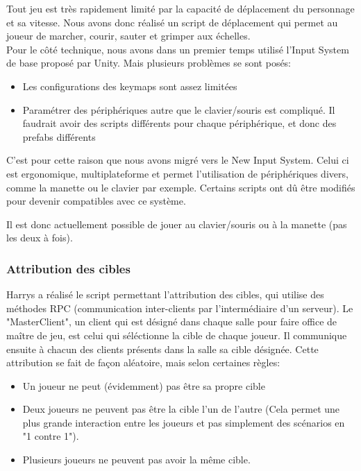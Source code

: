             Tout jeu est très rapidement limité par la capacité de déplacement du personnage et sa vitesse.
            Nous avons donc réalisé un script de déplacement qui permet au joueur de marcher, courir, sauter et grimper aux échelles.\\

            Pour le côté technique, nous avons dans un premier temps utilisé l'Input System de base proposé par Unity. Mais plusieurs problèmes se sont posés:
            \begin{itemize}
                \item Les configurations des keymaps sont assez limitées
                \item Paramétrer des périphériques autre que le clavier/souris est compliqué. Il faudrait avoir des scripts différents pour chaque périphérique, et donc des prefabs différents
            \end{itemize}
            C'est pour cette raison que nous avons migré vers le New Input System.
            Celui ci est ergonomique, multiplateforme et permet l'utilisation de périphériques divers, comme la manette ou le clavier par exemple.
            Certains scripts ont dû être modifiés pour devenir compatibles avec ce système.

            Il est donc actuellement possible de jouer au clavier/souris ou à la manette (pas les deux à fois).
            
        \subsubsection{Attribution des cibles}
            
            Harrys a réalisé le script permettant l'attribution des cibles, qui utilise des méthodes RPC (communication inter-clients par l'intermédiaire d'un serveur). Le "MasterClient", un client qui est désigné dans chaque salle pour faire office de maître de jeu, est celui qui séléctionne la cible de chaque joueur. Il communique ensuite à chacun des clients présents dans la salle sa cible désignée. Cette attribution se fait de façon aléatoire, mais selon certaines règles:
            \begin{itemize}
                \item Un joueur ne peut (évidemment) pas être sa propre cible
                \item Deux joueurs ne peuvent pas être la cible l'un de l'autre (Cela permet une plus grande interaction entre les joueurs et pas simplement des scénarios en "1 contre 1").
                \item Plusieurs joueurs ne peuvent pas avoir la même cible.
            \end{itemize}
                
